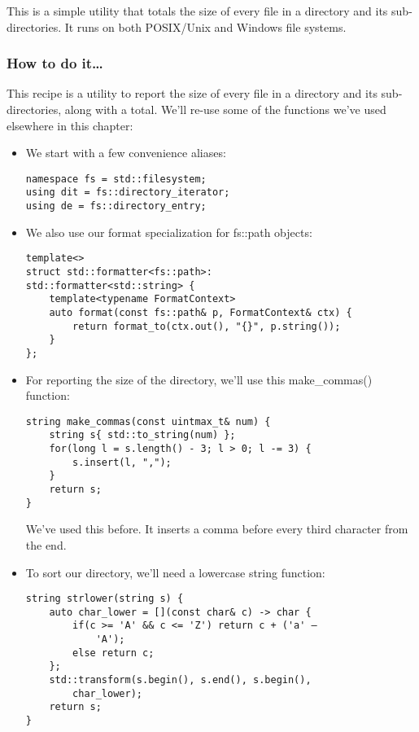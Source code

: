 
This is a simple utility that totals the size of every file in a directory and its sub-directories. It runs on both POSIX/Unix and Windows file systems.

\subsubsection{How to do it…}

This recipe is a utility to report the size of every file in a directory and its sub-directories, along with a total. We'll re-use some of the functions we've used elsewhere in this chapter:

\begin{itemize}
\item 
We start with a few convenience aliases:

\begin{lstlisting}[style=styleCXX]
namespace fs = std::filesystem;
using dit = fs::directory_iterator;
using de = fs::directory_entry;
\end{lstlisting}

\item 
We also use our format specialization for fs::path objects:

\begin{lstlisting}[style=styleCXX]
template<>
struct std::formatter<fs::path>:
std::formatter<std::string> {
	template<typename FormatContext>
	auto format(const fs::path& p, FormatContext& ctx) {
		return format_to(ctx.out(), "{}", p.string());
	}
};
\end{lstlisting}

\item 
For reporting the size of the directory, we'll use this make\_commas() function:

\begin{lstlisting}[style=styleCXX]
string make_commas(const uintmax_t& num) {
	string s{ std::to_string(num) };
	for(long l = s.length() - 3; l > 0; l -= 3) {
		s.insert(l, ",");
	}
	return s;
}
\end{lstlisting}

We've used this before. It inserts a comma before every third character from the end.

\item 
To sort our directory, we'll need a lowercase string function:

\begin{lstlisting}[style=styleCXX]
string strlower(string s) {
	auto char_lower = [](const char& c) -> char {
		if(c >= 'A' && c <= 'Z') return c + ('a' –
			'A');
		else return c;
	};
	std::transform(s.begin(), s.end(), s.begin(),
		char_lower);
	return s;
}
\end{lstlisting}


\end{itemize}
